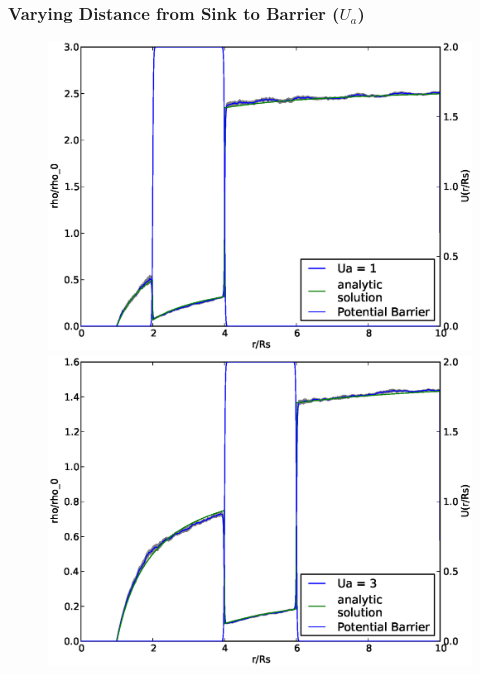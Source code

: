\subsubsection{Varying Distance from Sink to Barrier ($U_a$)}
\begin{figure}[H]
\centering
\begin{minipage}{.5 \textwidth}
    \centering
    \includegraphics[width=.95 \textwidth, keepaspectratio]{plots/cp/ua/Ua1.eps}
\end{minipage}\begin{minipage}{.5 \textwidth}
    \includegraphics[width=.95 \textwidth, keepaspectratio]{plots/cp/ua/Ua3.eps}
\end{minipage}
\begin{minipage}{.5 \textwidth}

\end{minipage}
\end{figure}
